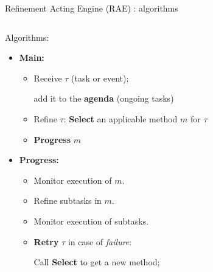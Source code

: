 \begin{frame}{Refinement Acting Engine (RAE) : algorithms}
    \begin{columns}[T]
  
        \begin{column}{0.65\textwidth}
            
            Algorithms:
            \small
            \begin{itemize}
                \setlength{\leftmargini}{-1pt}
                \item \textbf{Main:} 
                \begin{itemize}
                    \item Receive $\tau$ (task or event);
                    
                    add it to the \textbf{agenda} (ongoing tasks)
                    \item Refine $\tau$: \textbf{Select} an applicable method $m$ for $\tau$
                    \item \textbf{Progress} $m$
                \end{itemize}
                \item \textbf{Progress:}
                    \begin{itemize}
                        \item Monitor execution of $m$.
                        \item Refine subtasks in $m$.    
                        \item Monitor execution of subtasks.
                        \item \textbf{Retry} $\tau$ in case of \emph{failure}:
                    
                    Call \textbf{Select} to get a new method;
                    

\end{itemize}
\end{itemize}
\end{column}
\end{columns}
\end{frame}

